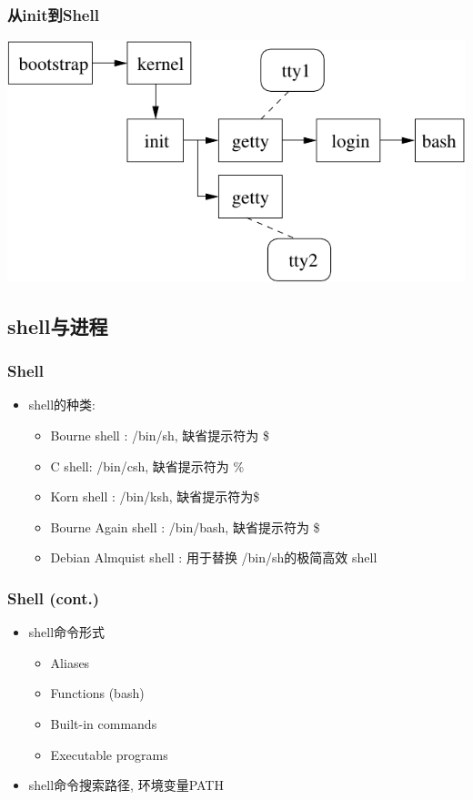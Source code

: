 \documentclass[compress]{beamer}
\begin{document}
\begin{frame}
\frametitle{从init到Shell}
\includegraphics[width=\hsize]{init.pdf}\\

\end{frame}

\subsection{shell与进程}

\begin{frame}
\frametitle{Shell}

\begin{itemize}
\item shell的种类:
    \begin{itemize}
    \item Bourne shell : /bin/sh, 缺省提示符为 \$
    \item C shell: /bin/csh, 缺省提示符为 \%
	\item Korn shell : /bin/ksh, 缺省提示符为\$
    \item Bourne Again shell : /bin/bash, 缺省提示符为 \$
    \item Debian Almquist shell : 用于替换 /bin/sh的极简高效 shell
    \end{itemize}

\end{itemize}

\end{frame}


\begin{frame}
  \frametitle{Shell (cont.)}
\begin{itemize}
  \item shell命令形式
\begin{itemize}
\item Aliases
\item Functions (bash)
\item Built-in commands
\item Executable programs
\end{itemize}

\item shell命令搜索路径, 环境变量PATH

\end{itemize}

\end{frame}
\end{document}
